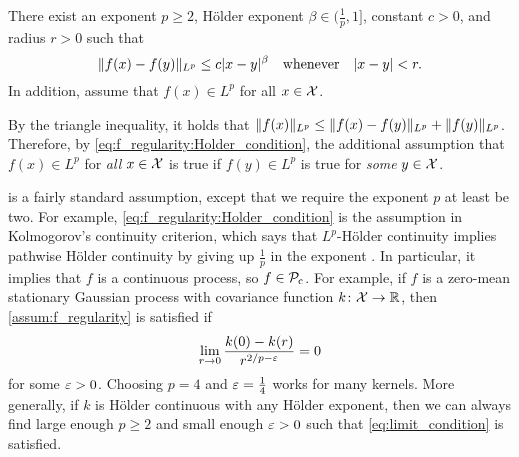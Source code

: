 \documentclass[12pt, twoside]{report}
\begin{document}
\begin{assumption} \label{assum:f_regularity}
    There exist an exponent $p\ge 2$, H\"older exponent $\beta \in (\tfrac1p, 1]$, constant $c > 0$, and radius $r > 0$ such that
    \begin{equation} \label{eq:f_regularity:Holder_condition}
        \norm{f(x) - f(y)}_{L^p} \le c \abs{x - y}^\beta
        \quad\text{whenever}\quad
        \abs{x - y} < r.
    \end{equation}
    In addition, assume that $f(x) \in L^p$ for all $x \in \X$.
\end{assumption}

By the triangle inequality, it holds that $\norm{f(x)}_{L^p} \le \norm{f(x) - f(y)}_{L^p} + \norm{f(y)}_{L^p}$.
Therefore, by \eqref{eq:f_regularity:Holder_condition}, the additional assumption that $f(x) \in L^p$ for \emph{all} $x \in \X$ is true if $f(y) \in L^p$ is true for \emph{some} $y \in \X$.

 is a fairly standard assumption, except that we require the exponent $p$ at least be two.
For example, \eqref{eq:f_regularity:Holder_condition} is the assumption in Kolmogorov's continuity criterion, which says that $L^p$-H\"older continuity 
implies pathwise H\"older continuity by giving up $\frac1p$ in the exponent \parencite[Section 4.2, Theorem 1.4.2;][]{Norris:2018:Advanced_Probability}.
In particular, it implies that $f$ is a continuous process, so $f \in \Pc\ss{c}$.
For example, if $f$ is a zero-mean stationary Gaussian process with covariance function $k\colon \X \to \R$, then
\cref{assum:f_regularity} is satisfied if
\begin{equation} \label{eq:limit_condition}
    \lim_{r \to 0} \frac{k(0) - k(r)}{r^{2/p - \e}} = 0
\end{equation}
for some $\e > 0$.
Choosing $p = 4$ and $\e = \tfrac14$ works for many kernels.
More generally, if $k$ is H\"older continuous with any H\"older exponent, then we can always find large enough $p \ge 2$ and small enough $\e > 0$ such that \eqref{eq:limit_condition} is satisfied.

%
\end{document}
